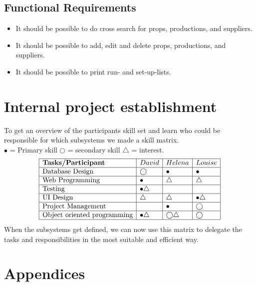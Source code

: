 \documentclass[12pt]{article}
\begin{document}
\subsection{Functional Requirements}
\begin{itemize}
  \item It should be possible to do cross search for props, productions, and suppliers.
  \item It should be possible to add, edit and delete props, productions, and suppliers.
  \item It should be possible to print run- and set-up-lists.
\end{itemize}
\section{Internal project establishment}
To get an overview of the participants skill set and learn who could be responsible for which subsystems we made a skill matrix.\\

$\bullet$ = Primary skill \quad $\bigcirc$ = secondary skill \quad $\bigtriangleup$ = interest.
\[
\begin{array}{|l|l|l|l|}
\hline
\textbf{Tasks/Participant} & David & Helena & Louise\\
\hline
\text{Database Design} & \bigcirc & \bullet & \bullet\\
\hline
\text{Web Programming} & \bullet & \bigtriangleup & \bigtriangleup\\
\hline
\text{Testing} & \bullet \bigtriangleup & & \\
\hline
\text{UI Design} & \bigtriangleup & \bigtriangleup & \bullet \bigtriangleup\\
\hline
\text{Project Management} & & \bullet & \bigcirc\\
\hline
\text{Object oriented programming} & \bullet \bigtriangleup& \bigcirc \bigtriangleup & \bigcirc \\
\hline
\end{array}
\]
When the subsystems get defined, we can now use this matrix to delegate the tasks and responsibilities in the most suitable and efficient way.
\section{Appendices}
\end{document}
